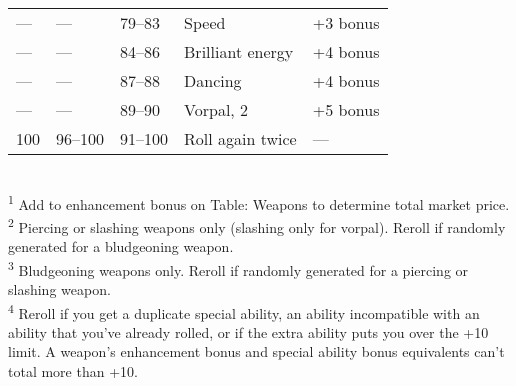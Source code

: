 \begin{table}[]
\begin{tabularx}{\linewidth}{lllXl}
--- & --- & 79--83 & Speed & +3 bonus\\
--- & --- & 84--86 & Brilliant energy & +4 bonus\\
--- & --- & 87--88 & Dancing & +4 bonus\\
--- & --- & 89--90 & Vorpal, 2 & +5 bonus\\
100 & 96--100 & 91--100 & Roll again twice & ---\\
\end{tabularx}\\
\textsuperscript{1} Add to enhancement bonus on Table: Weapons to determine total market price. \\
\textsuperscript{2} Piercing or slashing weapons only (slashing only for vorpal). Reroll if randomly generated for a bludgeoning weapon. \\
\textsuperscript{3} Bludgeoning weapons only. Reroll if randomly generated for a piercing or slashing weapon.\\
\textsuperscript{4} Reroll if you get a duplicate special ability, an ability incompatible with an ability that you've already rolled, or if the extra ability puts you over the +10 limit. A weapon's enhancement bonus and special ability bonus equivalents can't total more than +10.\\
\end{table}

